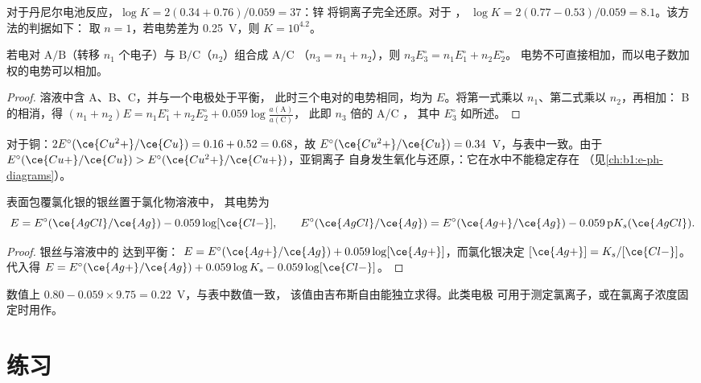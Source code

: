 对于丹尼尔电池反应，$\log K = 2(0.34 + 0.76)/0.059 = 37$：锌
将铜离子完全还原。对于 ，
$\log K = 2(0.77 - 0.53)/0.059 = 8.1$。该方法的判据如下：
取 $n = 1$，若电势差为 \qty{0.25}{V}，则 $K = 10^{4.2}$。

\begin{proposition}[组合电势]\label{prop:b1:nernst:combined-potentials}
若电对 $\mathrm{A}/\mathrm{B}$（转移 $n_1$ 个电子）与
$\mathrm{B}/\mathrm{C}$（$n_2$）组合成 $\mathrm{A}/\mathrm{C}$
（$n_3 = n_1 + n_2$），则 $n_3 E^\circ_3 = n_1 E^\circ_1 + n_2 E^\circ_2$。
电势不可直接相加，而以电子数加权的电势可以相加。
\end{proposition}

\begin{proof}
溶液中含 A、B、C，并与一个电极处于平衡，
此时三个电对的电势相同，均为 $E$。将第一式乘以 $n_1$、第二式乘以 $n_2$，再相加：
B 的相消，得 $(n_1 + n_2)E = n_1E^\circ_1 + n_2E^\circ_2 +
0.059\log\frac{a(\mathrm{A})}{a(\mathrm{C})}$，
此即 $n_3$ 倍的 A/C ，
其中 $E^\circ_3$ 如所述。
\end{proof}

对于铜：$2E^\circ(\ce{Cu^2+}/\ce{Cu}) = 0.16 + 0.52 = 0.68$，故
$E^\circ(\ce{Cu^2+}/\ce{Cu}) = 0.34$~V，与表中一致。由于
$E^\circ(\ce{Cu+}/\ce{Cu}) > E^\circ(\ce{Cu^2+}/\ce{Cu+})$，亚铜离子
自身发生氧化与还原，：它在水中不能稳定存在
（见\cref{ch:b1:e-ph-diagrams}）。

\begin{proposition}[第二类电极]\label{prop:b1:nernst:second-kind}
表面包覆氯化银的银丝置于氯化物溶液中，
其电势为
\[
  E = E^\circ(\ce{AgCl}/\ce{Ag}) - 0.059\log[\ce{Cl-}], \qquad
  E^\circ(\ce{AgCl}/\ce{Ag}) = E^\circ(\ce{Ag+}/\ce{Ag}) - 0.059\,\mathrm{p}K_s(\ce{AgCl}) .
\]
\end{proposition}

\begin{proof}
银丝与溶液中的  达到平衡：
$E = E^\circ(\ce{Ag+}/\ce{Ag}) + 0.059\log[\ce{Ag+}]$，而氯化银决定
$[\ce{Ag+}] = K_s/[\ce{Cl-}]$。代入得
$E = E^\circ(\ce{Ag+}/\ce{Ag}) + 0.059\log K_s - 0.059\log[\ce{Cl-}]$。
\end{proof}

数值上 $0.80 - 0.059 \times 9.75 = 0.22$~V，与表中数值一致，
该值由吉布斯自由能独立求得。此类电极
可用于测定氯离子，或在氯离子浓度固定时用作。

\section{练习}

